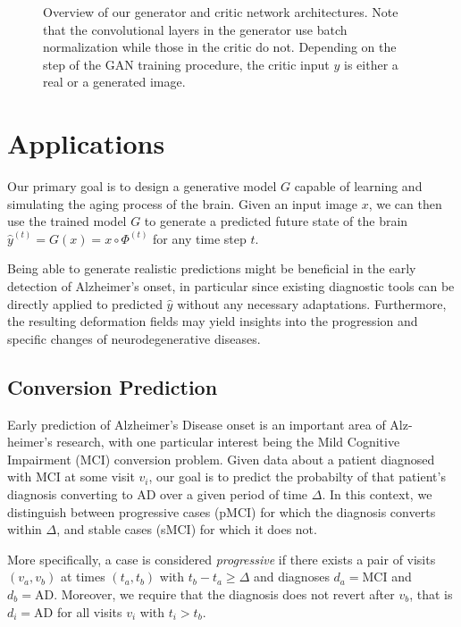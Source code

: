 \begin{figure}
	\centering
	
	\caption{Overview of our generator and critic network architectures. Note that the convolutional layers in the generator use batch normalization while those in the critic do not. Depending on the step of the GAN training procedure, the critic input $y$ is either a real or a generated image.}
	\label{fig:archour}
\end{figure}

\chapter{Applications}
Our primary goal is to design a generative model $G$ capable of learning and simulating the aging process of the brain. Given an input image $x$, we can then use the trained model $G$ to generate a predicted future state of the brain $\hat y^{(t)} = G(x) = x \circ \Phi^{(t)}$ for any time step $t$.

Being able to generate realistic predictions might be beneficial in the early detection of Alzheimer's onset, in particular since existing diagnostic tools can be directly applied to predicted $\hat y$ without any necessary adaptations. Furthermore, the resulting deformation fields may yield insights into the progression and specific changes of neurodegenerative diseases.

\section{Conversion Prediction} \label{sec:appconvpred}
Early prediction of Alzheimer's Disease onset is an important area of Alz-heimer's research, with one particular interest being the Mild Cognitive Impairment (MCI) conversion problem. Given data about a patient diagnosed with MCI at some visit $v_i$, our goal is to predict the probabilty of that patient's diagnosis converting to AD over a given period of time $ \Delta $. 
In this context, we distinguish between progressive cases (pMCI) for which the diagnosis converts within $\Delta$, and stable cases (sMCI) for which it does not.

More specifically, a case is considered \textit{progressive} if there exists a pair of visits $(v_a, v_b)$ at times $(t_a, t_b)$ with $ t_b - t_a \geq \Delta $ and diagnoses $d_a = \text{MCI} $ and $d_b = \text{AD} $. Moreover, we require that the diagnosis does not revert after $v_b$, that is $ d_i = \text{AD} $ for all visits $v_i$ with $t_i > t_b$.

